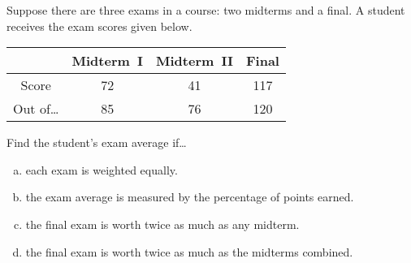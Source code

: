 \documentclass[11pt,letterpaper]{article}
\begin{document}

 Suppose there are three exams in a course: two midterms and a final. A student receives the exam scores given below. \par
	\begin{table}[!ht]
	\centering
	\begin{tabular}{|c|c|c|c|} \hline
	& Midterm~I & Midterm~II & Final \\ \hline
	Score & 72 & 41 & 117 \\ \hline
	Out of\dots & 85 & 76 & 120 \\ \hline
	\end{tabular}
	\end{table} \par
Find the student's exam average if\dots
	\begin{enumerate}[(a)]
	\item each exam is weighted equally.
	\item the exam average is measured by the percentage of points earned.
	\item the final exam is worth twice as much as any midterm.
	\item the final exam is worth twice as much as the midterms combined. 
	\end{enumerate} \pspace
\end{document}
